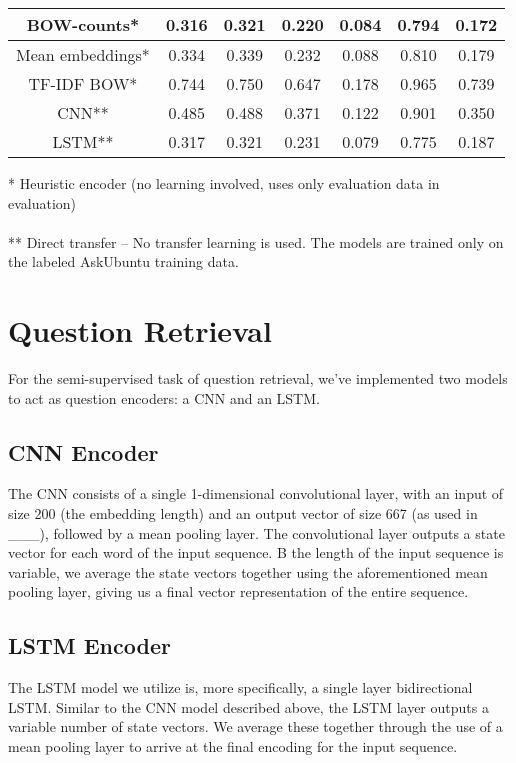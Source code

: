 \documentclass[12pt]{article}
\begin{document}
\begin{center}
\begin{tabular}{|c||c|c|c|c||c|c|}
			\cellcolor{red!15}BOW-counts* & 0.316 & 0.321 & 0.220 & 0.084 & 0.794 & 0.172 \\ \hline
			\cellcolor{red!15}Mean embeddings* & 0.334 & 0.339 & 0.232 & 0.088 & 0.810 & 0.179 \\ \hline
			\cellcolor{red!15}TF-IDF BOW* & 0.744 & 0.750 & 0.647 & 0.178 & 0.965 & 0.739 \\ \hline\hline
			\cellcolor{green!15}CNN** & 0.485 & 0.488 & 0.371 & 0.122 & 0.901 & 0.350 \\ \hline
			\cellcolor{green!15}LSTM** & 0.317 & 0.321 & 0.231 & 0.079 & 0.775 & 0.187 \\ \hline
		\end{tabular}
	\end{center}
	* Heuristic encoder (no learning involved, uses only evaluation data in evaluation) \\\\
	** Direct transfer -- No transfer learning is used. The models are trained only on the labeled AskUbuntu training data.

\section{Question Retrieval}
For the semi-supervised task of question retrieval, we've implemented two models to act as question encoders: a CNN and an LSTM.

\subsection{CNN Encoder}
The CNN consists of a single 1-dimensional convolutional layer, with an input of size 200 (the embedding length) and an output vector of size 667 (as used in \_\_\_), followed by a mean pooling layer. The convolutional layer outputs a state vector for each word of the input sequence. B the length of the input sequence is variable, we average the state vectors together using the aforementioned mean pooling layer, giving us a final vector representation of the entire sequence.

\subsection{LSTM Encoder}
The LSTM model we utilize is, more specifically, a single layer bidirectional LSTM. Similar to the CNN model described above, the LSTM layer outputs a variable number of state vectors. We average these together through the use of a mean pooling layer to arrive at the final encoding for the input sequence.
\end{document}
